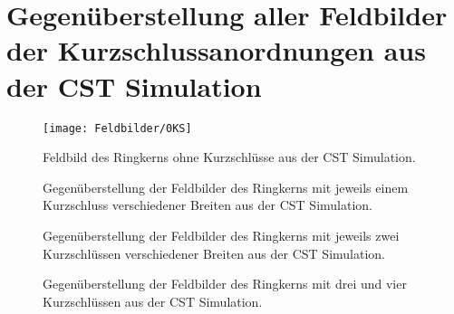 \section{Gegen\"uberstellung aller Feldbilder der Kurzschlussanordnungen aus der CST Simulation}
\label{sec:allfieldplots}
\begin{figure}[htb]
	\centering
	\texttt{[image: Feldbilder/0KS]}
	\caption{Feldbild des Ringkerns ohne Kurzschl\"usse aus der CST Simulation.}
	\label{fig:field0ks}
\end{figure}

\begin{figure}[htb]
	\centering
	\caption{Gegen\"uberstellung der Feldbilder des Ringkerns mit jeweils einem Kurzschluss verschiedener Breiten aus der CST Simulation.}
	\label{fig:field1ks}
\end{figure}

\begin{figure}[htb]
	\centering
	\caption{Gegen\"uberstellung der Feldbilder des Ringkerns mit jeweils zwei Kurzschl\"ussen verschiedener Breiten aus der CST Simulation.}
	\label{fig:field2ks}
\end{figure}

\begin{figure}[htb]
	\centering
	\caption{Gegen\"uberstellung der Feldbilder des Ringkerns mit drei und vier Kurzschl\"ussen aus der CST Simulation.}
	\label{fig:field34ks}
\end{figure}

